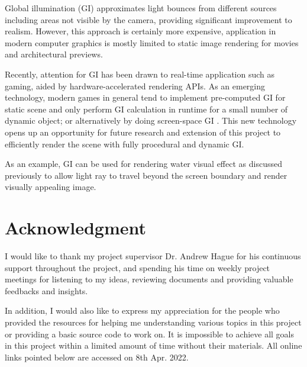 \documentclass[oneside, a4paper]{report}
\begin{document}
    Global illumination (GI) approximates light bounces from different sources including areas not visible by the camera, providing significant improvement to realism. However, this approach is certainly more expensive, application in modern computer graphics is mostly limited to static image rendering for movies and architectural previews.

    Recently, attention for GI has been drawn to real-time application such as gaming, aided by hardware-accelerated rendering APIs. As an emerging technology, modern games in general tend to implement pre-computed GI for static scene and only perform GI calculation in runtime for a small number of dynamic object; or alternatively by doing screen-space GI \cite{realtime_rt}. This new technology opens up an opportunity for future research and extension of this project to efficiently render the scene with fully procedural and dynamic GI.

    As an example, GI can be used for rendering water visual effect as discussed previously to allow light ray to travel beyond the screen boundary and render visually appealing image.

    \chapter{Acknowledgment}

    I would like to thank my project supervisor Dr. Andrew Hague for his continuous support throughout the project, and spending his time on weekly project meetings for listening to my ideas, reviewing documents and providing valuable feedbacks and insights.

    In addition, I would also like to express my appreciation for the people who provided the resources for helping me understanding various topics in this project or providing a basic source code to work on. It is impossible to achieve all goals in this project within a limited amount of time without their materials. All online links pointed below are accessed on 8th Apr. 2022.
\end{document}
